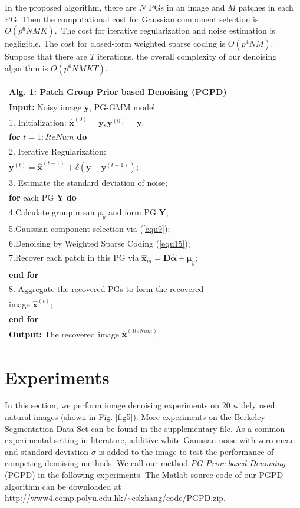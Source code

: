 In the proposed algorithm, there are $N$ PGs in an image and $M$ patches in each PG. Then the computational cost for Gaussian component selection is $O(p^{6}NMK)$.\ The cost for iterative regularization and noise estimation is negligible. The cost for closed-form weighted sparse coding is $O(p^{4}NM)$. Suppose that there are $T$ iterations, the overall complexity of our denoising algorithm is $O(p^{6}NMKT)$.
\begin{table}
\label{alg1}
\begin{tabular}{l}
\hline
\textbf{Alg. 1}: Patch Group Prior based Denoising (PGPD)
\\
\hline
\textbf{Input:} Noisy image $\bm{y}$, PG-GMM model
\\
1. Initialization: $\hat{\bm{x}}^{(0)}=\bm{y},\bm{y}^{(0)}=\bm{y}$;
\\
\textbf{for} $t = 1:IteNum$ \textbf{do}
\\
2. Iterative Regularization:
\\
\quad\quad\quad $\bm{y}^{(t)}=\hat{\bm{x}}^{(t-1)}+\delta(\bm{y}-\bm{y}^{(t-1)})$;
\\
3. Estimate the standard deviation of noise;
\\
\quad\textbf{for} each PG $\bm{Y}$ \textbf{do}
\\
4.\quad Calculate group mean $\bm{\mu}_{y}$ and form PG $\bm{\overline{Y}}$;
\\
5.\quad Gaussian component selection via (\ref{equ9});
\\
6.\quad Denoising by Weighted Sparse Coding (\ref{equ15});
\\
7.\quad Recover each patch in this PG via $\hat{\bm{x}}_{m}=\bm{D}\hat{\bm{\alpha}}+\bm{\mu}_{y}$;
\\
\quad\textbf{end for}
\\
8. Aggregate the recovered PGs to form the recovered
\\
\quad image $\hat{\bm{x}}^{(t)}$;
\\
\textbf{end for}
\\
\textbf{Output:} The recovered image $\hat{\bm{x}}^{(IteNum)}$.\\
\hline
\end{tabular}
\end{table}
\section{Experiments}
In this section, we perform image denoising experiments on 20 widely used natural images (shown in Fig. \ref{fig5}). More experiments on the Berkeley Segmentation Data Set \cite{bsds} can be found in the supplementary file. As a common experimental setting in literature, additive white Gaussian noise with zero mean and standard deviation $\sigma$ is added to the image to test the performance of competing denoising methods. We call our method \textsl{PG Prior based Denoising} (PGPD) in the following experiments. The Matlab source code of our PGPD algorithm can be downloaded at \url{http://www4.comp.polyu.edu.hk/~cslzhang/code/PGPD.zip}.

